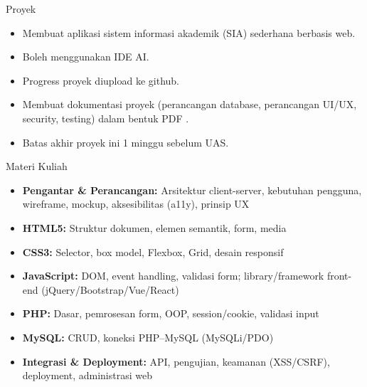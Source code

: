 \documentclass[handout]{beamer}
\begin{document}
	\begin{frame}{Proyek}
	\begin{itemize}
		\item Membuat aplikasi sistem informasi akademik (SIA) sederhana berbasis web.
		\item Boleh menggunakan IDE AI.
		\item Progress proyek diupload ke github.
		\item Membuat dokumentasi proyek (perancangan database, perancangan UI/UX, security, testing) dalam bentuk PDF .
		\item Batas akhir proyek ini 1 minggu sebelum UAS.
	\end{itemize}
\end{frame}

	\begin{frame}{Materi Kuliah}
		\begin{itemize}
			\item \textbf{Pengantar \& Perancangan:} Arsitektur client-server, kebutuhan pengguna, wireframe, mockup, aksesibilitas (a11y), prinsip UX
			\item \textbf{HTML5:} Struktur dokumen, elemen semantik, form, media
			\item \textbf{CSS3:} Selector, box model, Flexbox, Grid, desain responsif
			\item \textbf{JavaScript:} DOM, event handling, validasi form; library/framework front-end (jQuery/Bootstrap/Vue/React)
			\item \textbf{PHP:} Dasar, pemrosesan form, OOP, session/cookie, validasi input
			\item \textbf{MySQL:} CRUD, koneksi PHP--MySQL (MySQLi/PDO)
			\item \textbf{Integrasi \& Deployment:} API, pengujian, keamanan (XSS/CSRF), deployment, administrasi web
		\end{itemize}
	\end{frame}
	
\end{document}
